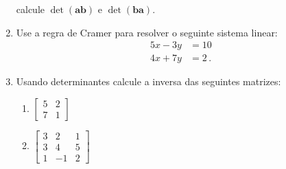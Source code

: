 \documentclass[12pt,a4paper]{article}
\newcommand{\mb}{\mathbf}
\begin{document}
\begin{enumerate}
calcule $\det(\mb{ab})$ e $\det(\mb{ba})$.
\item Use a regra de Cramer para resolver o seguinte sistema linear:
\begin{equation*}
\begin{split}
5x-3y&=10\\
4x+7y&=2\,.
\end{split}
\end{equation*}
\item Usando determinantes calcule a inversa das seguintes matrizes:
\begin{enumerate}
\item $\begin{bmatrix} 5&2\\7&1\end{bmatrix}$
\item $\begin{bmatrix} 3&2&1\\3&4&5\\1&-1&2\end{bmatrix}$
\end{enumerate}
\end{enumerate}
\end{document}
